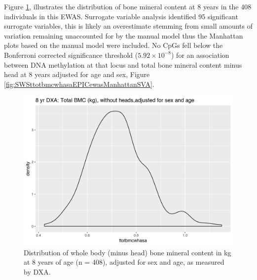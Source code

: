 \documentclass[
]{book}
\begin{document}
Figure \ref{fig:SWSttotbmcwhasa}, illustrates the distribution of bone mineral content at 8 years in the 408 individuals in this EWAS.
Surrogate variable analysis identified 95 significant surrogate variables, this is likely an overestimate stemming from small amounts of variation remaining unaccounted for by the manual model thus the Manhattan plots based on the manual model were included.
No CpGs fell below the Bonferroni corrected significance threshold (\(5.92\times10^{-8}\)) for an association between DNA methylation at that locus and total bone mineral content minus head at 8 years adjusted for age and sex, Figure \ref{fig:SWSttotbmcwhasaEPICewasManhattanSVA}.

\begin{figure}

{\centering \includegraphics[width=0.8\linewidth]{figs/SWS8yrBMCdist} 

}

\caption{Distribution of whole body (minus head) bone mineral content in kg at 8 years of age (n = 408), adjusted for sex and age, as measured by DXA.}\label{fig:SWSttotbmcwhasa}
\end{figure}
\end{document}
